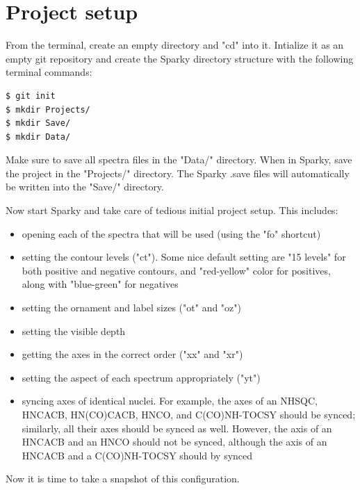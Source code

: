 \section{Project setup}
From the terminal, create an empty directory and "cd" into it.
Intialize it as an empty git repository and create the Sparky directory
structure with the following terminal commands:
\begin{verbatim}
$ git init
$ mkdir Projects/
$ mkdir Save/
$ mkdir Data/
\end{verbatim} 
Make sure to save all spectra files in the "Data/" directory.
When in Sparky, save the project in the "Projects/" directory.
The Sparky .save files will automatically be written into the "Save/"
directory.

Now start Sparky and take care of tedious initial project setup.  This includes:
\begin{itemize}
  \item opening each of the spectra that will be used (using the "fo" shortcut)
  \item setting the contour levels ("ct").  Some nice default setting are
    "15 levels" for both positive and negative contours, and "red-yellow" color
    for positives, along with "blue-green" for negatives
  \item setting the ornament and label sizes ("ot" and "oz")
  \item setting the visible depth
  \item getting the axes in the correct order ("xx" and "xr")
  \item setting the aspect of each spectrum appropriately ("yt")
  \item syncing axes of identical nuclei.  For example, the \nmrisoh{} axes of
    an NHSQC, HNCACB, HN(CO)CACB, HNCO, and C(CO)NH-TOCSY should be synced; 
    similarly, all their \nmrison{} axes should be synced as well.  However, the
    \nmrisoc{} axis of an HNCACB and an HNCO should not be synced, although the
    \nmrisoc{} axis of an HNCACB and a C(CO)NH-TOCSY should by synced
\end{itemize}
Now it is time to take a snapshot of this configuration.


